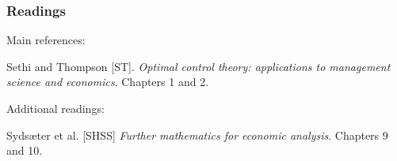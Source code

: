\documentclass[10pt]{beamer}
\theoremstyle{definition}
\begin{document}
\begin{frame}[fragile]
\frametitle{Readings}
Main references:

Sethi and Thompson [ST]. \emph{Optimal control theory: applications to management science and economics}. Chapters 1 and 2.\bigskip

Additional readings:

Syds\ae{}ter et al. [SHSS] \emph{Further mathematics for economic analysis}. Chapters 9 and 10.
\end{frame}
\end{document}
